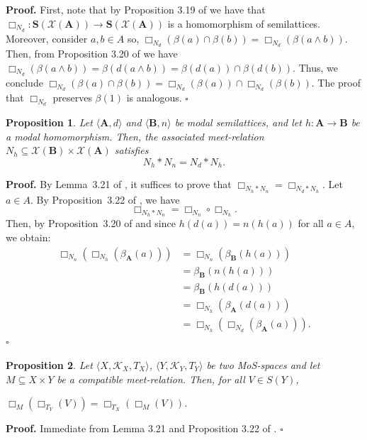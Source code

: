 \documentclass{article}
\newtheorem{proposition}{\bf Proposition}[section]
\newenvironment{proof}
{\par\noindent\textbf{Proof. }\rm}
{\hfill$\boldsymbol{\square}$\par\vspace{0.3cm}}
\begin{document}
\begin{proof}
    First, note that by Proposition 3.19 of \cite{CG} we have that $\Box_{N_d}\colon \mathbf{S}(\mathcal{X}(\mathbf{A})) \rightarrow \mathbf{S}(\mathcal{X}(\mathbf{A})) $ is a homomorphism of semilattices. Moreover, consider $a, b \in A$ so, $\Box_{N_d}(\beta(a)\cap \beta (b))=\Box_{N_d}(\beta(a \wedge b))$. Then, from Proposition 3.20 of \cite{CG} we have $\Box_{N_d}(\beta(a \wedge b))=\beta (d(a \wedge b))= \beta (d(a)) \cap \beta(d(b))$. Thus, we conclude $\Box_{N_d}(\beta(a)\cap \beta (b))= \Box_{N_d}(\beta(a))\cap \Box_{N_d}(\beta(b))$. The proof that $\Box_{N_d}$ preserves $\beta(1)$ is analogous.
\end{proof}
\begin{proposition}\label{R_h preserva adj derecha}
Let $\langle \mathbf{A},d\rangle$ and $\langle \mathbf{B},n\rangle$ be modal semilattices, and let $h\colon \mathbf{A}\to \mathbf{B}$ be a modal homomorphism. 
Then, the associated meet-relation 
$N_h\subseteq \mathcal{X}(\mathbf{B})\times \mathcal{X}(\mathbf{A})$ satisfies
\[
N_h*N_n=N_d*N_h .
\]
\end{proposition}
\begin{proof}
    By Lemma~3.21 of \cite{CG}, it suffices to prove that $\Box_{N_h * N_n} = \Box_{N_d * N_h}$. Let $a \in A$. By Proposition~3.22 of \cite{CG}, we have
\[
\Box_{N_h * N_n} = \Box_{N_n} \circ \Box_{N_h}.
\]
Then, by Proposition~3.20 of \cite{CG} and since $h(d(a)) = n(h(a))$ for all $a \in A$, we obtain:
\begin{align*}
\Box_{N_n}(\Box_{N_h}(\beta_\mathbf{A}(a)))
&= \Box_{N_n}(\beta_\mathbf{B}(h(a))) \\
&= \beta_\mathbf{B}(n(h(a))) \\
&= \beta_\mathbf{B}(h(d(a))) \\
&= \Box_{N_h}(\beta_\mathbf{A}(d(a))) \\
&= \Box_{N_h}(\Box_{N_d}(\beta_\mathbf{A}(a))).
\end{align*}
\end{proof}
 \begin{proposition}
     Let $\langle X,\mathcal{K}_X, T_X\rangle$, $\langle Y,\mathcal{K}_Y, T_Y\rangle$ be two MoS-spaces and let $M\subseteq X\times Y$ be a compatible meet-relation. Then, for all $V \in S(Y)$,
     \begin{center}
         $\Box_M(\Box_{T_Y}(V))=\Box_{T_X}(\Box_M(V))$.
     \end{center}
 \end{proposition}
 \begin{proof}
     Immediate from Lemma 3.21 and Proposition 3.22 of \cite{CG}.
 \end{proof}
\end{document}
